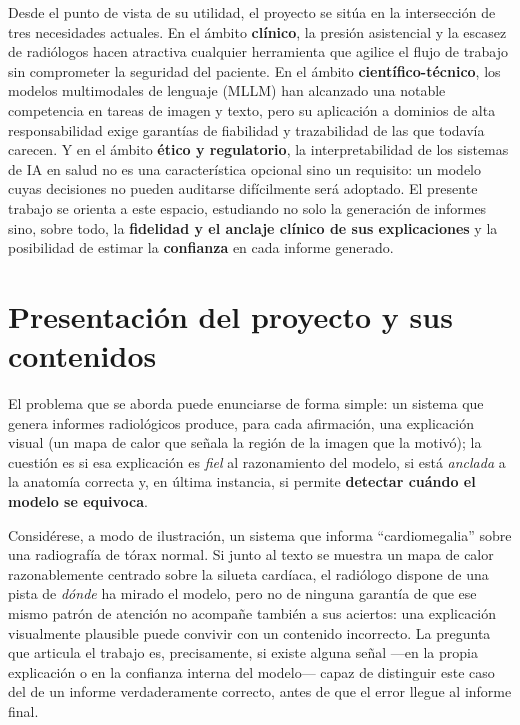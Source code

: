 Desde el punto de vista de su utilidad, el proyecto se sitúa en la intersección de tres
necesidades actuales. En el ámbito \textbf{clínico}, la presión asistencial y la escasez de
radiólogos hacen atractiva cualquier herramienta que agilice el flujo de trabajo sin comprometer
la seguridad del paciente. En el ámbito \textbf{científico-técnico}, los modelos multimodales de
lenguaje (MLLM) han alcanzado una notable competencia en tareas de imagen y texto, pero su
aplicación a dominios de alta responsabilidad exige garantías de fiabilidad y trazabilidad de las
que todavía carecen. Y en el ámbito \textbf{ético y regulatorio}, la interpretabilidad de los
sistemas de IA en salud no es una característica opcional sino un requisito: un modelo cuyas
decisiones no pueden auditarse difícilmente será adoptado. El presente trabajo se orienta a este
espacio, estudiando no solo la generación de informes sino, sobre todo, la \textbf{fidelidad y el
anclaje clínico de sus explicaciones} y la posibilidad de estimar la \textbf{confianza} en cada
informe generado.

\section{Presentación del proyecto y sus contenidos}
El problema que se aborda puede enunciarse de forma simple: un sistema que genera informes
radiológicos produce, para cada afirmación, una explicación visual (un mapa de calor que señala la
región de la imagen que la motivó); la cuestión es si esa explicación es \textit{fiel} al
razonamiento del modelo, si está \textit{anclada} a la anatomía correcta y, en última instancia,
si permite \textbf{detectar cuándo el modelo se equivoca}.

Considérese, a modo de ilustración, un sistema que informa ``cardiomegalia'' sobre una radiografía
de tórax normal. Si junto al texto se muestra un mapa de calor razonablemente centrado sobre la
silueta cardíaca, el radiólogo dispone de una pista de \emph{dónde} ha mirado el modelo, pero no de
ninguna garantía de que ese mismo patrón de atención no acompañe también a sus aciertos: una
explicación visualmente plausible puede convivir con un contenido incorrecto. La pregunta que
articula el trabajo es, precisamente, si existe alguna señal —en la propia explicación o en la
confianza interna del modelo— capaz de distinguir este caso del de un informe verdaderamente
correcto, antes de que el error llegue al informe final.

